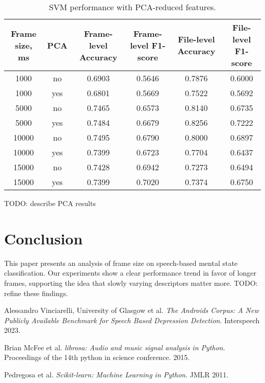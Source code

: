 \documentclass[conference]{IEEEtran}
\begin{document}

\begin{table}[h]
\centering
\caption{SVM performance with PCA-reduced features.}
\begin{tabular}{|c|c|c|c|c|c|}
\hline
\textbf{Frame size, ms} & \textbf{PCA} & \textbf{Frame-level Accuracy} & \textbf{Frame-level F1-score} & \textbf{File-level Accuracy} & \textbf{File-level F1-score} \\
\hline
1000 & no & 0.6903 & 0.5646 & 0.7876 & 0.6000 \\
\hline
1000 & yes & 0.6801 & 0.5669 & 0.7522 & 0.5692 \\
\hline
5000 & no & 0.7465 & 0.6573 & 0.8140 & 0.6735 \\
\hline
5000 & yes & 0.7484 & 0.6679 & 0.8256 & 0.7222 \\
\hline
10000 & no & 0.7495 & 0.6790 & 0.8000 & 0.6897 \\
\hline
10000 & yes & 0.7399 & 0.6723 & 0.7704 & 0.6437 \\
\hline
15000 & no & 0.7428 & 0.6942 & 0.7273 & 0.6494 \\
\hline
15000 & yes & 0.7399 & 0.7020 & 0.7374 & 0.6750 \\
\hline
\end{tabular}
\label{tab:svm_pca}
\end{table}

TODO: describe PCA results

\section{Conclusion}
This paper presents an analysis of frame size on speech-based mental state classification. 
Our experiments show a clear performance trend in favor of longer frames, supporting the idea that slowly varying descriptors matter more. 
TODO: refine these findings.

\begin{thebibliography}{9}
Alessandro Vinciarelli, University of Glasgow et al. \textit{The Androids Corpus: A New Publicly Available Benchmark for Speech Based Depression Detection}. Interspeech 2023.

Brian McFee et al. \textit{librosa: Audio and music signal analysis in Python}. Proceedings of the 14th python in science conference. 2015.

Pedregosa et al. \textit{Scikit-learn: Machine Learning in Python}. JMLR 2011.

\end{thebibliography}
\end{document}
